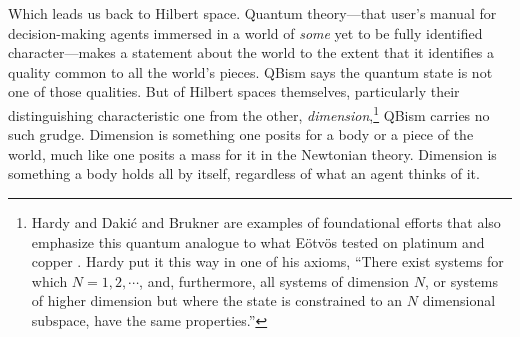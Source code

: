 \documentclass[aps,pra,superscriptaddress,12pt,tightenlines,nofootinbib]{revtex4-2}
\begin{document}
Which leads us back to Hilbert space.  Quantum theory---that user's manual for decision-making agents immersed in a world of {\it some\/} yet to be fully identified character---makes a statement about the world to the extent that it identifies a quality common to all the world's pieces.  QBism says the quantum state is not one of those qualities.  But of Hilbert spaces themselves, particularly their distinguishing characteristic one from the other, {\it dimension},\footnote{Hardy \cite{Hardy01a,Hardy01b} and Daki\'c and Brukner \cite{Dakic09} are examples of foundational efforts that also emphasize this quantum analogue to what E\"otv\"os tested on platinum and copper \cite{Fuchs04b}.  Hardy put it this way in one of his axioms, ``There exist systems for which $N = 1, 2, \cdots$, and, furthermore, all systems of dimension $N$, or systems of higher dimension but where the state is constrained to an $N$ dimensional subspace, have the same properties.''} QBism car\-ries no such grudge.  Dimension is something one posits for a body or a piece of the world, much like one posits a mass for it in the Newtonian theory.  Dimension is something a body holds all by itself, regardless of what an agent thinks of it.
\end{document}
